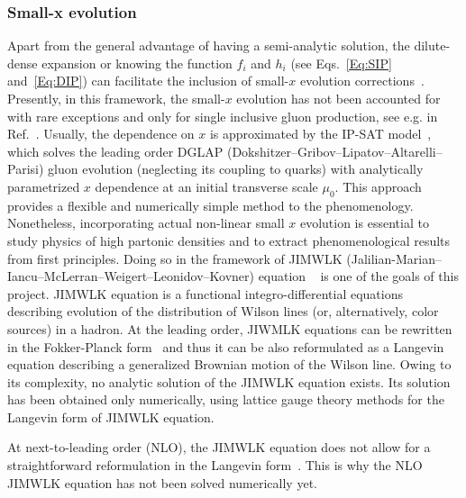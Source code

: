 \subsubsection*{Small-x evolution}
Apart from the general advantage of having a semi-analytic solution, 
the dilute-dense expansion or knowing the function $f_i$ and $h_i$ (see Eqs.~\eqref{Eq:SIP} and~\eqref{Eq:DIP}) 
can facilitate the inclusion of small-$x$ evolution corrections~\cite{Kuraev:1977fs,
Balitsky:1978ic, 
Balitsky:1997mk, 
Balitsky:1998ya, 
Kovchegov:1999yj,
Kovchegov:1999ua, 
JalilianMarian:1997dw, 
JalilianMarian:1997gr,
Iancu:2001ad, 
Iancu:2000hn}.
Presently, in this framework,  the small-$x$ evolution has not been accounted for 
with rare exceptions and only
for single inclusive gluon production, see e.g. in Ref.~\cite{Dumitru:2018iko}. 
Usually, the dependence on $x$ is approximated by the IP-SAT model~\cite{Kowalski:2003hm,Rezaeian:2012ji},
which solves the leading order  DGLAP (Dokshitzer--Gribov--Lipatov--Altarelli--Parisi)  gluon evolution (neglecting its coupling to quarks) 
with analytically parametrized $x$ dependence at an initial 
transverse scale $\mu_0$. 
This approach provides a flexible and numerically simple method 
to the phenomenology. Nonetheless, incorporating actual non-linear 
small $x$ evolution is essential to study physics 
of high partonic densities and to extract phenomenological results from first principles.  
Doing so in the framework of JIMWLK (Jalilian-Marian--Iancu--McLerran--Weigert--Leonidov--Kovner) equation 
~\cite{JalilianMarian:1997dw, 
JalilianMarian:1997gr,
Iancu:2001ad, 
Iancu:2000hn} 
is one of the goals of this project. 
JIMWLK equation is a functional integro-differential 
equations describing evolution of the distribution of Wilson lines (or, alternatively, color sources) in a 
hadron. At the leading order, JIWMLK equations can be rewritten in the Fokker-Planck form~\cite{Weigert:2000gi}
and thus it can be also reformulated as  a Langevin equation describing a generalized Brownian motion of 
the Wilson line. Owing to its complexity, no analytic solution of the JIMWLK equation exists. 
Its solution has been obtained only numerically, using lattice gauge theory methods for the
 Langevin form of JIMWLK equation.

 At next-to-leading order (NLO), the JIMWLK equation does not allow for a straightforward reformulation in the Langevin form~\cite{Kovner:2014lca,Balitsky:2013fea}. 
 This is why the NLO JIMWLK equation has not been solved numerically yet. 	




